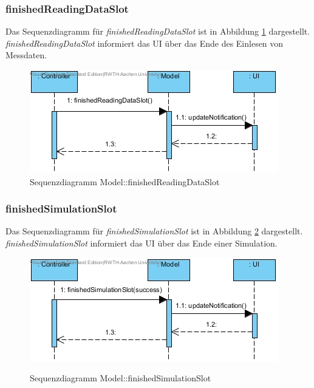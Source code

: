 \subsubsection*{finishedReadingDataSlot}

Das Sequenzdiagramm für \emph{finishedReadingDataSlot} ist in Abbildung \ref{Sequenzdiagramm Model::finishedReadingDataSlot} dargestellt. \emph{finishedReadingDataSlot} informiert das UI über das Ende des Einlesen von Messdaten.

\begin{figure}[H]
	\centering
	\includegraphics[scale=.85]{Bilder/Model__finishedReadingDataSlot().jpg}
	\caption{Sequenzdiagramm Model::finishedReadingDataSlot}
	\label{Sequenzdiagramm Model::finishedReadingDataSlot}
\end{figure}

\subsubsection*{finishedSimulationSlot}

Das Sequenzdiagramm für \emph{finishedSimulationSlot} ist in Abbildung \ref{Sequenzdiagramm Model::finishedSimulationSlot} dargestellt. \emph{finishedSimulationSlot} informiert das UI über das Ende einer Simulation.

\begin{figure}[H]
	\centering
	\includegraphics[scale=.85]{Bilder/Model__finishedSimulationSlot().jpg}\\
	\caption{Sequenzdiagramm Model::finishedSimulationSlot}
	\label{Sequenzdiagramm Model::finishedSimulationSlot}
\end{figure}


